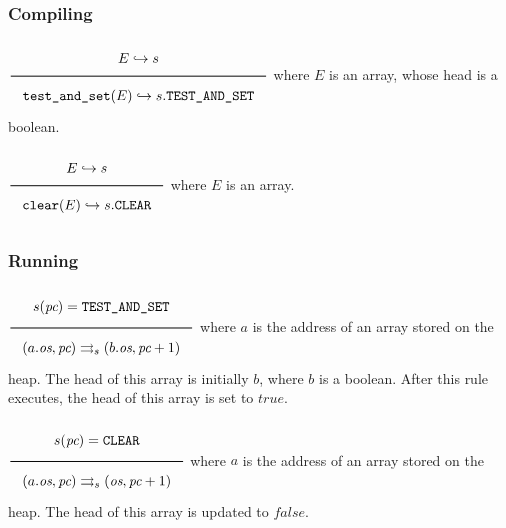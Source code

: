 \subsubsection{Compiling}
\label{sec:org025d9fd}
\(\Rule{E \translateaux s}{\texttt{test\_and\_set}(E) \translateaux s.\texttt{TEST\_AND\_SET}}\\\)
where \(E\) is an array, whose head is a boolean.

\(\Rule{E \translateaux s}{\texttt{clear}(E) \translateaux s.\texttt{CLEAR}}\\\)
where \(E\) is an array.

\subsubsection{Running}
\label{sec:org6d01845}
\(\Rule{s(\textit{pc}) = \texttt{TEST\_AND\_SET}}{(a.\textit{os},\textit{pc}) \transition (b.\textit{os},\textit{pc} + 1)}\\\)
where \(a\) is the address of an array stored on the heap. The head of this array is initially \(b\), where \(b\) is a boolean. After this rule executes, the head of this array is set to \(\textit{true}\).

\(\Rule{s(\textit{pc}) = \texttt{CLEAR}}{(a.\textit{os},\textit{pc}) \transition (\textit{os},\textit{pc} + 1)}\\\)
where \(a\) is the address of an array stored on the heap. The head of this array is updated to \(\textit{false}\).

